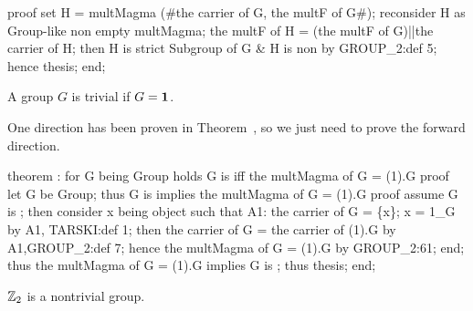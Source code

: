 \nwenddocs{}\endmoddef\nwstartdeflinemarkup{}\nwenddeflinemarkup
proof
  set H = multMagma (#the carrier of G, the multF of G#);
  reconsider H as Group-like non empty multMagma;
  the multF of H = (the multF of G)||the carrier of H;
  then H is strict Subgroup of G & H is non  by GROUP_2:def 5;
  hence thesis;
end;
\nwendcode{}\nwdocspar

\begin{theorem}\label{thm:preparatory:trivialIff1}
A group $G$ is trivial if $G=\mathbf{1}$.
\end{theorem}

One direction has been proven in Theorem~, so we just
need to prove the forward direction.



\nwenddocs{}\endmoddef\nwstartdeflinemarkup{}\nwenddeflinemarkup
theorem :
  for G being Group
  holds G is  iff the multMagma of G = (1).G
proof
  let G be Group;
  thus G is  implies the multMagma of G = (1).G
  proof
    assume G is ;
    then consider x being object such that
    A1: the carrier of G = \{x\};
    x = 1_G by A1, TARSKI:def 1;
    then the carrier of G = the carrier of (1).G by A1,GROUP_2:def 7;
    hence the multMagma of G = (1).G by GROUP_2:61;
  end;
  thus the multMagma of G = (1).G implies G is ;
  thus thesis;
end;
\eatline
{}\nwendcode{}\nwdocspar
\begin{lemma}
$\mathbb{Z}_{2}$ is a nontrivial group.
\end{lemma}

